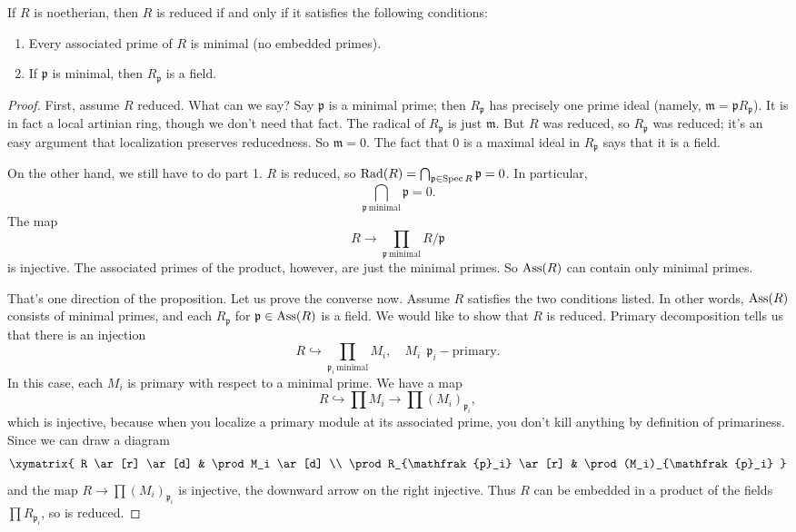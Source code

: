 \begin{proposition}
If $R$ is noetherian, then $R$ is reduced if and only if it satisfies the
following conditions:
\begin{enumerate}
\item Every associated prime of $R$ is	minimal (no embedded primes).
\item If $\mathfrak{p}$ is minimal, then $R_{\mathfrak{p}}$ is	a field.
\end{enumerate}
\end{proposition}
\begin{proof}
First, assume $R$ reduced. What can we say? Say $\mathfrak{p}$ is a minimal
prime; then $R_{\mathfrak{p}}$ has precisely one prime ideal (namely,
$\mathfrak{m}=\mathfrak{p}R_{\mathfrak{p}}$). It is in fact a local artinian
ring, though we
don't need that fact. The radical of $R_{\mathfrak{p}}$ is just $\mathfrak{m}$.
But $R$ was reduced, so $R_{\mathfrak{p}}$ was reduced; it's an easy argument
that localization preserves reducedness. So $\mathfrak{m}=0$. The fact that 0
is a maximal ideal in $R_{\mathfrak{p}}$ says that it is a field.

On the other hand, we still have to do part 1. $R$ is reduced, so $\operatorname{Rad}(R) =
\bigcap_{\mathfrak{p} \in \operatorname{Spec} R} \mathfrak{p} = 0$. In particular,
\[ \bigcap_{\mathfrak{p} \ \mathrm{minimal}}\mathfrak{p} = 0.  \]
The map
\[ R \to \prod_{\mathfrak{p} \ \mathrm{minimal}}R/\mathfrak{p}	\]
is injective. The associated primes of the product, however, are just the
minimal primes. So $\operatorname{Ass}(R)$ can contain only minimal primes.

That's one direction of the proposition. Let us prove the converse now. Assume
$R$ satisfies the two conditions listed. In other words, $\operatorname{Ass}(R)$ consists of
minimal primes, and each $R_{\mathfrak{p}}$ for $\mathfrak{p} \in \operatorname{Ass}(R)$ is a
field. We would like to show that $R$ is reduced.
Primary decomposition tells us that there is an injection
\[ R \hookrightarrow \prod_{\mathfrak{p}_i \ \mathrm{minimal}} M_i, \quad M_i
\ \  \mathfrak{p}_i-\mathrm{primary}. \]
In this case, each $M_i$ is primary with respect to a minimal prime. We have a
map
\[ R \hookrightarrow \prod M_i \to \prod (M_i)_{\mathfrak{p}_i},  \]
which is injective, because when you localize a primary module at its
associated prime, you don't kill anything by definition of primariness. Since
we can draw a diagram
\[
\xymatrix{
R \ar[r] \ar[d]  &  \prod M_i \ar[d]  \\
\prod R_{\mathfrak{p}_i} \ar[r] & \prod (M_i)_{\mathfrak{p}_i}
}
\]
and the map $R \to \prod (M_i)_{\mathfrak{p}_i}$ is injective, the downward
arrow on the right injective. Thus $R$ can be embedded in
a product of the fields $\prod R_{\mathfrak{p}_i}$, so is reduced.
\end{proof}

